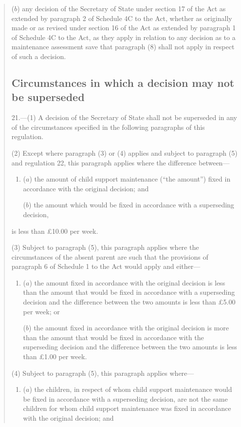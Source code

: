 \documentclass[12pt,a4paper]{article}
\begin{document}
\begin{quotation}
\begin{enumerate}
($b$) any decision of the Secretary of State under section 17 of the Act as extended by paragraph 2 of Schedule 4C to the Act, whether as originally made or as revised under section 16 of the Act as extended by paragraph 1 of Schedule 4C to the Act, as they apply in relation to any decision as to a maintenance assessment save that paragraph (8) shall not apply in respect of such a decision.
\end{enumerate}

\subsection*{Circumstances in which a decision may not be superseded}

21.—(1) A decision of the Secretary of State shall not be superseded in any of the circumstances specified in the following paragraphs of this regulation.

(2) Except where paragraph (3) or (4) applies and subject to paragraph (5) and regulation 22, this paragraph applies where the difference between---
\begin{enumerate}\item[]
\begin{sloppypar}
($a$) the amount of child support maintenance (“the amount”) fixed in accordance with the original decision; and
\end{sloppypar}

($b$) the amount which would be fixed in accordance with a superseding decision,
\end{enumerate}
is less than £10.00 per week.

(3) Subject to paragraph (5), this paragraph applies where the circumstances of the absent parent are such that the provisions of paragraph 6 of Schedule 1 to the Act would apply and either---
\begin{enumerate}\item[]
($a$) the amount fixed in accordance with the original decision is less than the amount that would be fixed in accordance with a superseding decision and the difference between the two amounts is less than £5.00 per week; or

($b$) the amount fixed in accordance with the original decision is more than the amount that would be fixed in accordance with the superseding decision and the difference between the two amounts is less than £1.00 per week.
\end{enumerate}

(4) Subject to paragraph (5), this paragraph applies where---
\begin{enumerate}\item[]
($a$) the children, in respect of whom child support maintenance would be fixed in accordance with a superseding decision, are not the same children for whom child support maintenance was fixed in accordance with the original decision; and


\end{enumerate}
\end{quotation}
\end{document}
